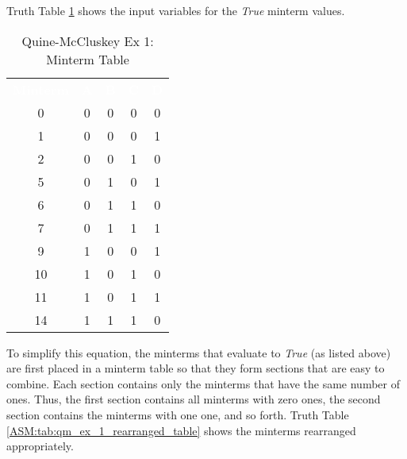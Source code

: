 Truth Table \ref{ASM:tab:qm_ex_1_minterm_table} shows the input variables for the \emph{True} minterm values.

\begin{table}[H]
	\sffamily
	\newcommand{\head}[1]{\textcolor{white}{\textbf{#1}}}		
	\begin{center}
		\begin{tabular}{ccccc} 
			\rowcolor{black!75}
			\head{Minterm} & \head{A} & \head{B} & \head{C} & \head{D} \\
			0 & 0 & 0 & 0 & 0 \\
			1 & 0 & 0 & 0 & 1 \\
			2 & 0 & 0 & 1 & 0 \\
			5 & 0 & 1 & 0 & 1 \\
			6 & 0 & 1 & 1 & 0 \\
			7 & 0 & 1 & 1 & 1 \\
			9 & 1 & 0 & 0 & 1 \\
			10 & 1 & 0 & 1 & 0 \\
			11 & 1 & 0 & 1 & 1 \\
			14 & 1 & 1 & 1 & 0 
		\end{tabular}
	\end{center}
	\caption{Quine-McCluskey Ex 1: Minterm Table}
  \label{ASM:tab:qm_ex_1_minterm_table}
\end{table}

To simplify this equation, the minterms that evaluate to \emph{True} (as listed above) are first placed in a minterm table so that they form sections that are easy to combine. Each section contains only the minterms that have the same number of ones. Thus, the first section contains all minterms with zero ones, the second section contains the minterms with one one, and so forth. Truth Table \ref{ASM:tab:qm_ex_1_rearranged_table} shows the minterms rearranged appropriately.


